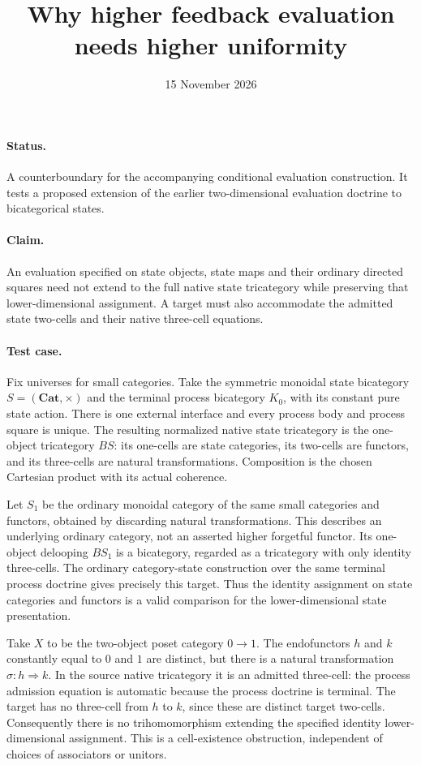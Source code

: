 \documentclass{article}
\title{Why higher feedback evaluation needs higher uniformity}
\date{15 November 2026}
\begin{document}
\maketitle
\paragraph{Status.} A counterboundary for the accompanying conditional evaluation construction. It tests a proposed extension of the earlier two-dimensional evaluation doctrine to bicategorical states.

\paragraph{Claim.} An evaluation specified on state objects, state maps and their ordinary directed squares need not extend to the full native state tricategory while preserving that lower-dimensional assignment. A target must also accommodate the admitted state two-cells and their native three-cell equations.

\paragraph{Test case.} Fix universes for small categories. Take the symmetric monoidal state bicategory $S=(\mathbf{Cat},\times)$ and the terminal process bicategory $K_0$, with its constant pure state action. There is one external interface and every process body and process square is unique. The resulting normalized native state tricategory is the one-object tricategory $BS$: its one-cells are state categories, its two-cells are functors, and its three-cells are natural transformations. Composition is the chosen Cartesian product with its actual coherence.

Let $S_1$ be the ordinary monoidal category of the same small categories and functors, obtained by discarding natural transformations. This describes an underlying ordinary category, not an asserted higher forgetful functor. Its one-object delooping $B S_1$ is a bicategory, regarded as a tricategory with only identity three-cells. The ordinary category-state construction over the same terminal process doctrine gives precisely this target. Thus the identity assignment on state categories and functors is a valid comparison for the lower-dimensional state presentation.

Take $X$ to be the two-object poset category $0\to1$. The endofunctors $h$ and $k$ constantly equal to $0$ and $1$ are distinct, but there is a natural transformation $\sigma:h\Rightarrow k$. In the source native tricategory it is an admitted three-cell: the process admission equation is automatic because the process doctrine is terminal. The target has no three-cell from $h$ to $k$, since these are distinct target two-cells. Consequently there is no trihomomorphism extending the specified identity lower-dimensional assignment. This is a cell-existence obstruction, independent of choices of associators or unitors.
\end{document}
